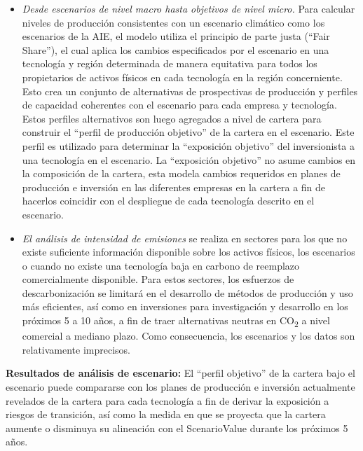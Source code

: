 \documentclass[10pt,table]{article}\usepackage[]{graphicx}\usepackage[]{color}
\begin{document}
\begin{multicols}{2}
\begin{itemize}
			\item{\textit{Desde escenarios de nivel macro hasta objetivos de nivel micro. }Para calcular niveles de producción consistentes con un escenario climático como los escenarios de la AIE, el modelo utiliza el principio de parte justa (“Fair Share”), el cual aplica los cambios especificados por el escenario en una tecnología y región determinada de manera equitativa para todos los propietarios de activos físicos en cada tecnología en la región concerniente. Esto crea un conjunto de alternativas de prospectivas de producción y perfiles de capacidad coherentes con el escenario para cada empresa y tecnología. Estos perfiles alternativos son luego agregados a nivel de cartera para construir el “perfil de producción objetivo” de la cartera en el escenario. Este perfil es utilizado para determinar la “exposición objetivo” del inversionista a una tecnología en el escenario. La “exposición objetivo” no asume cambios en la composición de la cartera, esta modela cambios requeridos en planes de producción e inversión en las diferentes empresas en la cartera a fin de hacerlos coincidir con el despliegue de cada tecnología descrito en el escenario. } 
			
			\item{\textit{El análisis de intensidad de emisiones} se realiza en sectores para los que no existe suficiente información disponible sobre los activos físicos, los escenarios o cuando no existe una tecnología baja en carbono de reemplazo comercialmente disponible. Para estos sectores, los esfuerzos de descarbonización se limitará en el desarrollo de métodos de producción y uso más eficientes, así como en inversiones para investigación y desarrollo en los próximos 5 a 10 años, a fin de traer alternativas neutras en CO\textsubscript{2} a nivel comercial a mediano plazo. Como consecuencia, los escenarios y los datos son relativamente imprecisos.}
				\end{itemize}
		
		\textbf{Resultados de análisis de escenario:} El “perfil objetivo” de la cartera bajo el escenario puede compararse con los planes de producción e inversión actualmente revelados de la cartera para cada tecnología a fin de derivar la exposición a riesgos de transición, así como la medida en que se proyecta que la cartera aumente o disminuya su alineación con el ScenarioValue durante los próximos 5 años.
		\newline
		
	\end{multicols}
			
\end{document}
